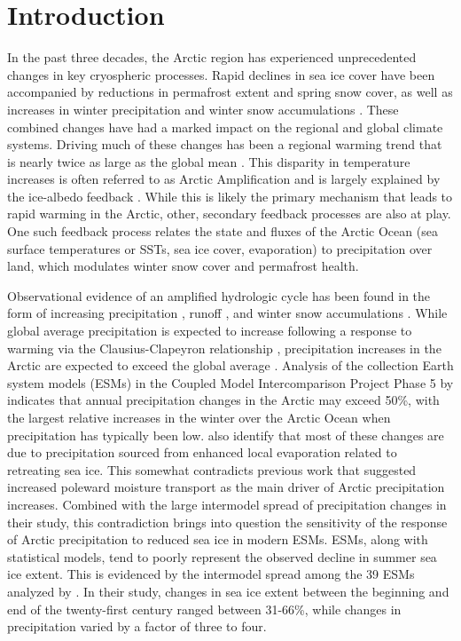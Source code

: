\section{Introduction}
\label{sec:intro_ch5}

In the past three decades, the Arctic region has experienced unprecedented changes in key cryospheric processes.
Rapid declines in sea ice cover have been accompanied by reductions in permafrost extent and spring snow cover, as well as increases in winter precipitation and winter snow accumulations \citep{Kohler_2006,Callaghan_2011,Bulygina_2009}.
These combined changes have had a marked impact on the regional and global climate systems.
Driving much of these changes has been a regional warming trend that is nearly twice as large as the global mean \citep{Serreze_2006c,Screen_2010}.
This disparity in temperature increases is often referred to as Arctic Amplification and is largely explained by the ice-albedo feedback \citep{Curry_1995}.
While this is likely the primary mechanism that leads to rapid warming in the Arctic, other, secondary feedback processes are also at play.
One such feedback process relates the state and fluxes of the Arctic Ocean (sea surface temperatures or SSTs, sea ice cover, evaporation) to precipitation over land, which modulates winter snow cover and permafrost health.

Observational evidence of an amplified hydrologic cycle \citep{Stocker_2005} has been found in the form of increasing precipitation \citep{Rawlins_2006}, runoff \citep{Peterson_2002}, and winter snow accumulations \citep{Kohler_2006,Bulygina_2009}.
While global average precipitation is expected to increase following a response to warming via the Clausius-Clapeyron relationship \citep[e.g. ][]{Held_2006,Stephens_2008,Byrne_2015}, precipitation increases in the Arctic are expected to exceed the global average \citep{Stocker_2005}.
Analysis of the collection Earth system models (ESMs) in the Coupled Model Intercomparison Project Phase 5 \citep[CMIP5; ][]{Taylor_2012} by \citet{Bintanja_2014} indicates that annual precipitation changes in the Arctic may exceed 50\%, with the largest relative increases in the winter over the Arctic Ocean when precipitation has typically been low.
\citet{Bintanja_2014} also identify that most of these changes are due to precipitation sourced from enhanced local evaporation related to retreating sea ice.
This somewhat contradicts previous work that suggested increased poleward moisture transport as the main driver of Arctic precipitation increases.
Combined with the large intermodel spread of precipitation changes in their study, this contradiction brings into question the sensitivity of the response of Arctic precipitation to reduced sea ice in modern ESMs.
ESMs, along with statistical models, tend to poorly represent the observed decline in summer sea ice extent.
This is evidenced by the intermodel spread among the 39 ESMs analyzed by \citet{Bintanja_2014}.
In their study, changes in sea ice extent between the beginning and end of the twenty-first century ranged between 31-66\%, while changes in precipitation varied by a factor of three to four.

